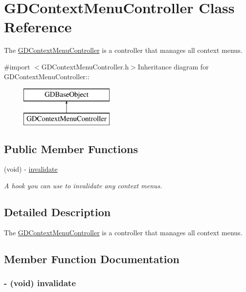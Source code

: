 \hypertarget{interface_g_d_context_menu_controller}{
\section{GDContextMenuController Class Reference}
\label{interface_g_d_context_menu_controller}
}


The \hyperlink{interface_g_d_context_menu_controller}{GDContextMenuController} is a controller that manages all context menus.  


{\ttfamily \#import $<$GDContextMenuController.h$>$}Inheritance diagram for GDContextMenuController::\begin{figure}[H]
\begin{center}
\leavevmode
\includegraphics[height=2cm]{interface_g_d_context_menu_controller}
\end{center}
\end{figure}
\subsection*{Public Member Functions}
\begin{DoxyCompactItemize}
\item 
(void) -\/ \hyperlink{interface_g_d_context_menu_controller_a66a832a6cbbbae2960d94bce4f2b4833}{invalidate}
\begin{DoxyCompactList}\small\item\em A hook you can use to invalidate any context menus. \item\end{DoxyCompactList}\end{DoxyCompactItemize}


\subsection{Detailed Description}
The \hyperlink{interface_g_d_context_menu_controller}{GDContextMenuController} is a controller that manages all context menus. 

\subsection{Member Function Documentation}
\hypertarget{interface_g_d_context_menu_controller_a66a832a6cbbbae2960d94bce4f2b4833}{
\subsubsection[{invalidate}]{\setlength{\rightskip}{0pt plus 5cm}-\/ (void) invalidate }}
\label{interface_g_d_context_menu_controller_a66a832a6cbbbae2960d94bce4f2b4833}


